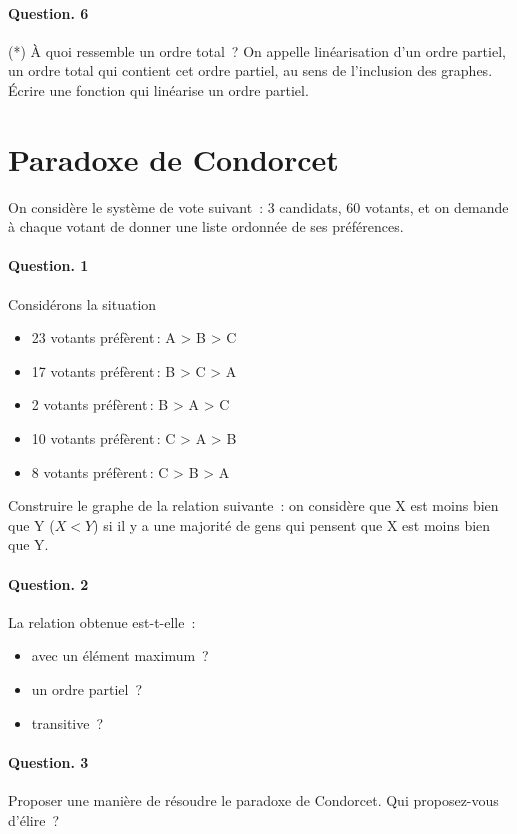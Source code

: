 \documentclass[10pt,a4paper]{article}
\begin{document}
\paragraph{Question. 6\\}
(*) À quoi ressemble un ordre total~? On appelle linéarisation d'un ordre
partiel, un ordre total qui contient cet ordre partiel, au sens de l'inclusion
des graphes. Écrire une
fonction qui linéarise un ordre partiel.
 
\section{Paradoxe de Condorcet}
On considère le système de vote suivant~: 3 candidats,
60 votants, et on demande à chaque votant de donner une liste ordonnée de ses 
préférences.
\paragraph{Question. 1\\}
Considérons la situation         
\begin{itemize}
\item 23 votants préfèrent\,: A > B > C
\item 17 votants préfèrent\,: B > C > A
\item 2 votants préfèrent\,: B > A > C
\item 10 votants préfèrent\,: C > A > B
\item 8 votants préfèrent\,: C > B > A
\end{itemize}
Construire le graphe de la relation suivante~: on considère que X est moins 
bien que Y ($X<Y$) si il y a une majorité de gens qui pensent que X 
est moins bien que Y.
\paragraph{Question. 2\\}
La relation obtenue est-t-elle~:
\begin{itemize}
\item avec un élément maximum~?
\item un ordre partiel~?
\item transitive~?
\end{itemize}
\paragraph{Question. 3\\}
Proposer une manière de résoudre le paradoxe de Condorcet. Qui proposez-vous 
d'élire~?
\end{document}
